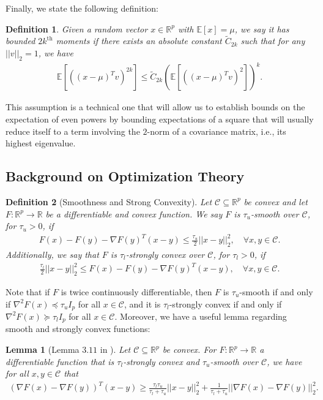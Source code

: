 \documentclass{article}
\newtheorem{lemma}{Lemma}
\newtheorem{definition}{Definition}[section]
\begin{document}
Finally, we state the following definition:
\begin{definition}
\label{def:bd_moments}
Given a random vector $x \in \mathbb{R}^p$ with $\mathbb{E}[x] = \mu$, we say it has bounded $2k^{\text{th}}$ moments if there exists an absolute constant $\widetilde{C}_{2k}$ such that for any $||v||_2 = 1$, we have
\begin{align*}
\mathbb{E}\left[((x - \mu)^Tv)^{2k}\right] \leq \widetilde{C}_{2k}\left(\mathbb{E}\left[((x - \mu)^Tv)^{2}\right]\right)^k.
\end{align*}
\end{definition}
This assumption is a technical one that will allow us to establish bounds on the expectation of even powers by bounding expectations of a square that will usually reduce itself to a term involving the $2$-norm of a covariance matrix, i.e., its highest eigenvalue.

\subsection{Background on Optimization Theory}\label{sec:Appendix_Optim_Prelim}

\begin{definition}[Smoothness and Strong Convexity]
Let $\mathcal{C} \subseteq \mathbb{R}^p$ be convex and let $F : \mathbb{R}^p \rightarrow \mathbb{R}$ be a differentiable and convex function. We say $F$ is $\tau_u$-smooth over $\mathcal{C}$, for $\tau_u > 0$, if
\begin{align*}
F(x) - F(y) - \nabla F(y)^T(x - y) \leq \frac{\tau_u}{2}||x - y||_2^2, \quad \forall x, y \in \mathcal{C}.
\end{align*}
Additionally, we say that $F$ is $\tau_l$-strongly convex over $\mathcal{C}$, for $\tau_l > 0$, if
\begin{align*}
\frac{\tau_l}{2}||x - y||_2^2 \leq F(x) - F(y) - \nabla F(y)^T(x -y), \quad \forall x, y \in \mathcal{C}.
\end{align*}
\end{definition}

Note that if $F$ is twice continuously differentiable, then $F$ is $\tau_u$-smooth if and only if $\nabla^2 F(x) \preceq \tau_u I_p$ for all $x \in \mathcal{C}$, and it is $\tau_l$-strongly convex if and only if $\nabla^2F(x) \succeq \tau_l I_p$ for all $x \in \mathcal{C}$. Moreover, we have a useful lemma regarding smooth and strongly convex functions:
\begin{lemma}[Lemma $3.11$ in \cite{lemma311}]
\label{lemma:auxilGD}
Let $\mathcal{C} \subseteq \mathbb{R}^p$ be convex. For $F : \mathbb{R}^p \rightarrow \mathbb{R}$ a differentiable function that is $\tau_l$-strongly convex and $\tau_u$-smooth over $\mathcal{C}$, we have for all $x, y \in \mathcal{C}$ that
\begin{align*}
(\nabla F(x) - \nabla F(y))^T(x - y) \geq \frac{\tau_l\tau_u}{\tau_l + \tau_u}||x - y||_2^2 + \frac{1}{\tau_l + \tau_u}||\nabla F(x) - \nabla F(y)||_2^2.
\end{align*}
\end{lemma}
\end{document}
